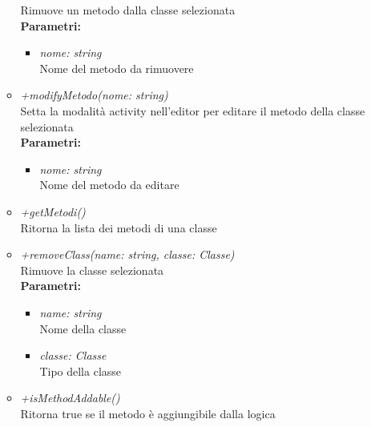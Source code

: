 \begin{itemize}
\begin{itemize}
    		Rimuove un metodo dalla classe selezionata\\
    		\textbf{Parametri:}
    		\begin{itemize}
    			\item \emph{nome: string}\\
    			Nome del metodo da rimuovere
    		\end{itemize}
    		\item \emph{+modifyMetodo(nome: string)}\\
    		Setta la modalità activity nell'editor per editare il metodo della classe selezionata\\
    		\textbf{Parametri:}
    		\begin{itemize}
    			\item \emph{nome: string}\\
    			Nome del metodo da editare
    		\end{itemize}
    		\item \emph{+getMetodi()}\\
    		Ritorna la lista dei metodi di una classe
    		\item \emph{+removeClass(name: string, classe: Classe)}\\
    		Rimuove la classe selezionata\\
    		\textbf{Parametri:}
    		\begin{itemize}
    			\item \emph{name: string}\\
    			Nome della classe
    			\item \emph{classe: Classe}\\
    			Tipo della classe
    		\end{itemize}
    		\item \emph{+isMethodAddable()}\\
    		Ritorna true se il metodo è aggiungibile dalla logica
		\end{itemize}
\end{itemize}